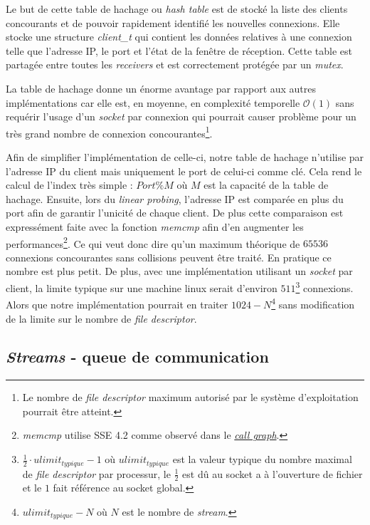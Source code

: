 \documentclass[../main.tex]{subfiles}
\begin{document}
Le but de cette table de hachage ou \textit{hash table} est de stocké la liste des clients concourants et de pouvoir rapidement identifié les nouvelles
connexions. Elle stocke une structure \textit{client\_t} qui contient les données relatives à une connexion telle que l'adresse IP, le port et l'état
de la fenêtre de réception. Cette table est partagée entre toutes les \textit{receivers} et est correctement protégée par un \textit{mutex}.

La table de hachage donne un énorme avantage par rapport aux autres implémentations car elle est, en moyenne, en complexité temporelle $\mathcal{O}(1)$
sans requérir l'usage d'un \textit{socket} par connexion qui pourrait causer problème pour un très grand nombre de connexion concourantes\footnote{
    Le nombre de \textit{file descriptor} maximum autorisé par le système d'exploitation pourrait être atteint.}.

Afin de simplifier l'implémentation de celle-ci, notre table de hachage n'utilise par l'adresse IP du client mais uniquement le port de celui-ci comme
clé. Cela rend le calcul de l'index très simple : $Port \% M$ où $M$ est la capacité de la table de hachage. Ensuite, lors du \textit{linear probing},
l'adresse IP est comparée en plus du port afin de garantir l'unicité de chaque client. De plus cette comparaison est expressément faite avec
la fonction \textit{memcmp} afin d'en augmenter les performances\footnote{ \textit{memcmp} utilise SSE 4.2 comme observé dans le \textit{\hyperref[sec:annexs_call_graph]{call graph}}.}.
Ce qui veut donc dire qu'un maximum théorique de $65536$ connexions concourantes sans collisions peuvent être traité. En pratique ce nombre
est plus petit. De plus, avec une implémentation utilisant un \textit{socket} par client, la limite typique sur une machine linux serait
d'environ $511$\footnote{ $\frac{1}{2} \cdot ulimit_{typique} - 1$ où $ulimit_{typique}$ est la valeur typique du nombre maximal de \textit{file descriptor} par processur,
 le $\frac{1}{2}$ est dû au socket a à l'ouverture de fichier et le $1$ fait référence au socket global. } connexions. Alors
que notre implémentation pourrait en traiter $1024 - N$\footnote{ $ulimit_{typique} - N$ où $N$ est le nombre de \textit{stream}.} sans modification de la limite sur le nombre de \textit{file descriptor}.

\newpage

\subsection{\textit{Streams} - queue de communication}
\label{sec:syscalls}
\end{document}
